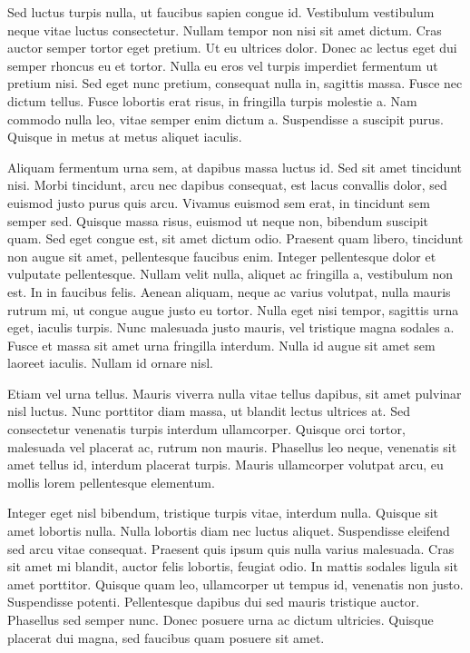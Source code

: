 \documentclass[journal]{IEEEtran}
\begin{document}
Sed luctus turpis nulla, ut faucibus sapien congue id. Vestibulum vestibulum neque vitae luctus consectetur. Nullam tempor non nisi sit amet dictum. Cras auctor semper tortor eget pretium. Ut eu ultrices dolor. Donec ac lectus eget dui semper rhoncus eu et tortor. Nulla eu eros vel turpis imperdiet fermentum ut pretium nisi. Sed eget nunc pretium, consequat nulla in, sagittis massa. Fusce nec dictum tellus. Fusce lobortis erat risus, in fringilla turpis molestie a. Nam commodo nulla leo, vitae semper enim dictum a. Suspendisse a suscipit purus. Quisque in metus at metus aliquet iaculis.

Aliquam fermentum urna sem, at dapibus massa luctus id. Sed sit amet tincidunt nisi. Morbi tincidunt, arcu nec dapibus consequat, est lacus convallis dolor, sed euismod justo purus quis arcu. Vivamus euismod sem erat, in tincidunt sem semper sed. Quisque massa risus, euismod ut neque non, bibendum suscipit quam. Sed eget congue est, sit amet dictum odio. Praesent quam libero, tincidunt non augue sit amet, pellentesque faucibus enim. Integer pellentesque dolor et vulputate pellentesque. Nullam velit nulla, aliquet ac fringilla a, vestibulum non est. In in faucibus felis. Aenean aliquam, neque ac varius volutpat, nulla mauris rutrum mi, ut congue augue justo eu tortor. Nulla eget nisi tempor, sagittis urna eget, iaculis turpis. Nunc malesuada justo mauris, vel tristique magna sodales a. Fusce et massa sit amet urna fringilla interdum. Nulla id augue sit amet sem laoreet iaculis. Nullam id ornare nisl.

Etiam vel urna tellus. Mauris viverra nulla vitae tellus dapibus, sit amet pulvinar nisl luctus. Nunc porttitor diam massa, ut blandit lectus ultrices at. Sed consectetur venenatis turpis interdum ullamcorper. Quisque orci tortor, malesuada vel placerat ac, rutrum non mauris. Phasellus leo neque, venenatis sit amet tellus id, interdum placerat turpis. Mauris ullamcorper volutpat arcu, eu mollis lorem pellentesque elementum.

Integer eget nisl bibendum, tristique turpis vitae, interdum nulla. Quisque sit amet lobortis nulla. Nulla lobortis diam nec luctus aliquet. Suspendisse eleifend sed arcu vitae consequat. Praesent quis ipsum quis nulla varius malesuada. Cras sit amet mi blandit, auctor felis lobortis, feugiat odio. In mattis sodales ligula sit amet porttitor. Quisque quam leo, ullamcorper ut tempus id, venenatis non justo. Suspendisse potenti. Pellentesque dapibus dui sed mauris tristique auctor. Phasellus sed semper nunc. Donec posuere urna ac dictum ultricies. Quisque placerat dui magna, sed faucibus quam posuere sit amet.
\end{document}

